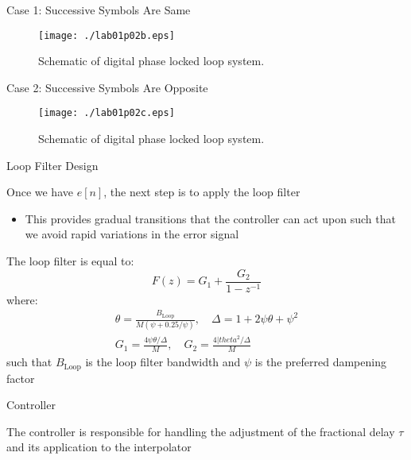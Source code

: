 \documentclass[10pt]{beamer}
\begin{document}

\begin{frame}[fragile]{Case 1: Successive Symbols Are Same}


  \begin{figure}[h]
     \centering
     \texttt{[image: ./lab01p02b.eps]}
     \caption{Schematic of digital phase locked loop system.}
  \end{figure}

\end{frame}



\begin{frame}[fragile]{Case 2: Successive Symbols Are Opposite}


  \begin{figure}[h]
     \centering
     \texttt{[image: ./lab01p02c.eps]}
     \caption{Schematic of digital phase locked loop system.}
  \end{figure}

\end{frame}



\begin{frame}[fragile]{Loop Filter Design}

Once we have $e[n]$, the next step is to apply the loop filter
\begin{itemize}
 \item This provides gradual transitions that the controller can act upon such that we avoid rapid variations in the error signal
\end{itemize}

The loop filter is equal to:
\begin{equation}
 F(z)=G_1+\frac{G_2}{1-z^{-1}}
\end{equation}
where:
\begin{align}
 \theta=\frac{B_{\mathrm{Loop}}}{M(\psi+0.25/\psi)},\quad\Delta=1+2\psi\theta+\psi^2\\
 G_1=\frac{4\psi\theta/\Delta}{M},\quad{G_2}=\frac{4|theta^2/\Delta}{M}
\end{align}
such that $B_{\mathrm{Loop}}$ is the loop filter bandwidth and $\psi$ is the preferred dampening factor

\end{frame}



\begin{frame}[fragile]{Controller}

The controller is responsible for handling the adjustment of the fractional delay $\tau$ and its application to the interpolator

\end{frame}
\end{document}
